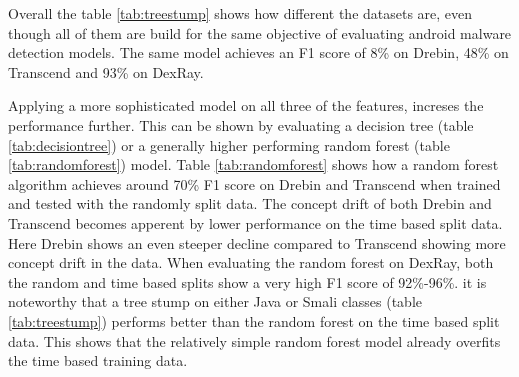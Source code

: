 Overall the table \ref{tab:treestump} shows how different the datasets are, 
even though all of them are build for the same objective of evaluating android malware 
detection models.
The same model achieves an F1 score of 8\% on Drebin, 48\% on Transcend and 93\% on DexRay.

\begin{table}[t]
    \caption{\label{tab:randomforest}%
    Random Forest (n\_estimators=300, max\_depth=25) results by dataset and split. Features include Java classes, Smali classes, and APK Size.}
\end{table}

Applying a more sophisticated model on all three of the features, increses the performance further.
This can be shown by evaluating a decision tree (table \ref{tab:decisiontree}) or a generally higher performing random forest (table \ref{tab:randomforest}) model. 
Table \ref{tab:randomforest} shows how a random forest algorithm achieves around 70\% F1 score on Drebin and Transcend when 
trained and tested with the randomly split data.
The concept drift of both Drebin and Transcend becomes apperent by lower performance on the time based split data.
Here Drebin shows an even steeper decline compared to Transcend showing more concept drift in the data.
When evaluating the random forest on DexRay, both the random and time based splits show a very high F1 score of 92\%-96\%.
it is noteworthy that a tree stump on either Java or Smali classes (table \ref{tab:treestump}) performs better than the random forest on the time based split data.
This shows that the relatively simple random forest model already overfits the time based training data.

